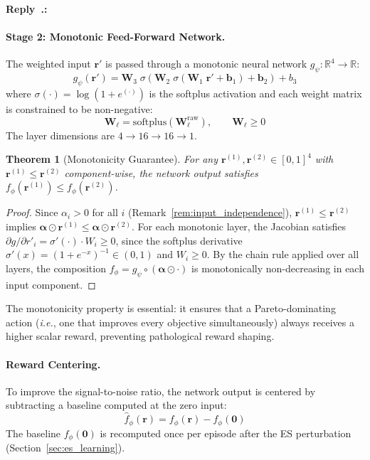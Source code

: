 \documentclass[11pt]{article}
\newtheorem{theorem}{Theorem}
\newcounter{reviewer}
\newcounter{replyctr}[reviewer]
\renewcommand{\thereplyctr}{\thereviewer.\arabic{replyctr}}
\newenvironment{reply}
  {\refstepcounter{replyctr}%
   \addtocounter{replyctr}{-1}%
   \medskip\noindent
   \begin{sf}\textbf{Reply~\thereplyctr:}\ }
  {\addtocounter{replyctr}{1}%
   \medskip\end{sf}}
\begin{document}
\begin{refsection}
\begin{mdframed}[style=Resp]
\begin{reply}
\paragraph{Stage 2: Monotonic Feed-Forward Network.}
The weighted input $\mathbf{r}'$ is passed through a monotonic neural network $g_\psi: \mathbb{R}^4 \to \mathbb{R}$:
\begin{equation}
    g_\psi(\mathbf{r}') = \mathbf{W}_3\;\sigma\!\left(\mathbf{W}_2\;\sigma\!\left(\mathbf{W}_1\;\mathbf{r}' + \mathbf{b}_1\right) + \mathbf{b}_2\right) + b_3
    \label{eq:monotonic_net}
\end{equation}
where $\sigma(\cdot) = \log(1 + e^{(\cdot)})$ is the softplus activation and each weight matrix is constrained to be non-negative:
\begin{equation}
    \mathbf{W}_\ell = \mathrm{softplus}(\mathbf{W}_\ell^{\mathrm{raw}}), \qquad \mathbf{W}_\ell \geq 0
    \label{eq:weight_constraint}
\end{equation}
The layer dimensions are $4 \to 16 \to 16 \to 1$.

\begin{theorem}[Monotonicity Guarantee]
\label{thm:monotonicity}
For any $\mathbf{r}^{(1)}, \mathbf{r}^{(2)} \in [0,1]^4$ with $\mathbf{r}^{(1)} \leq \mathbf{r}^{(2)}$ component-wise, the network output satisfies $f_\phi(\mathbf{r}^{(1)}) \leq f_\phi(\mathbf{r}^{(2)})$.
\end{theorem}

\begin{proof}
Since $\alpha_i > 0$ for all $i$ (Remark~\ref{rem:input_independence}), $\mathbf{r}^{(1)} \leq \mathbf{r}^{(2)}$ implies $\boldsymbol{\alpha} \odot \mathbf{r}^{(1)} \leq \boldsymbol{\alpha} \odot \mathbf{r}^{(2)}$. For each monotonic layer, the Jacobian satisfies $\partial g / \partial r'_i = \sigma'(\cdot) \cdot W_i \geq 0$, since the softplus derivative $\sigma'(x) = (1 + e^{-x})^{-1} \in (0,1)$ and $W_i \geq 0$. By the chain rule applied over all layers, the composition $f_\phi = g_\psi \circ (\boldsymbol{\alpha} \odot \cdot)$ is monotonically non-decreasing in each input component.
\end{proof}

The monotonicity property is essential: it ensures that a Pareto-dominating action (\emph{i.e.}, one that improves every objective simultaneously) always receives a higher scalar reward, preventing pathological reward shaping.

\paragraph{Reward Centering.}
To improve the signal-to-noise ratio, the network output is centered by subtracting a baseline computed at the zero input:
\begin{equation}
    \hat{f}_\phi(\mathbf{r}) = f_\phi(\mathbf{r}) - f_\phi(\mathbf{0})
    \label{eq:reward_centering}
\end{equation}
The baseline $f_\phi(\mathbf{0})$ is recomputed once per episode after the ES perturbation (Section~\ref{sec:es_learning}).


\end{reply}
\end{mdframed}
\end{refsection}
\end{document}
